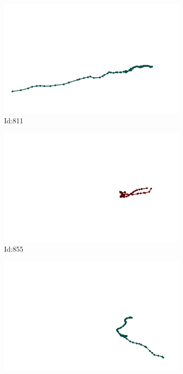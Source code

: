 \documentclass[12pt,twoside]{report}
\begin{document}
\begin{figure}
\begin{subfigure}[b]{0.20\textwidth}
\centering
\includegraphics[width=\textwidth]{../trajectories/811.png}
\caption{Id:811}
\end{subfigure}
\begin{subfigure}[b]{0.20\textwidth}
\centering
\includegraphics[width=\textwidth]{../trajectories/855.png}
\caption{Id:855}
\end{subfigure}
\begin{subfigure}[b]{0.20\textwidth}
\centering
\includegraphics[width=\textwidth]{../trajectories/909.png}

\end{subfigure}
\end{figure}
\end{document}
